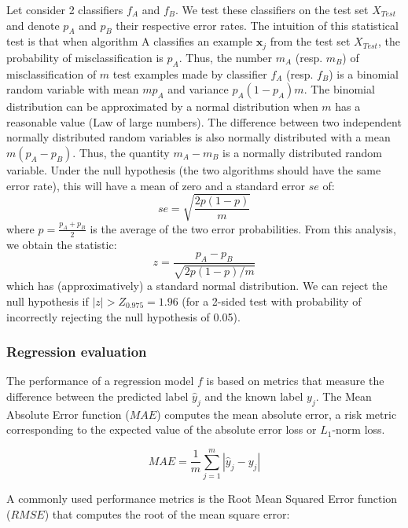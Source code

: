 Let consider 2 classifiers $f_A$ and $f_B$. We test these classifiers on the test set $X_{Test}$ and denote $p_A$ and $p_B$ their respective error rates. The intuition of this statistical test is that when algorithm A classifies an example $\textbf{x}_j$ from the test set $X_{Test}$, the probability of misclassification is $p_A$. Thus, the number $m_A$ (resp. $m_B$) of misclassification of $m$ test examples made by classifier $f_A$ (resp. $f_B$) is a binomial random variable with mean $mp_A$ and variance $p_A(1-p_A)m$. The binomial distribution can be approximated by a normal distribution when $m$ has a reasonable value (Law of large numbers). The difference between two independent normally distributed random variables is also normally distributed with a mean $m(p_A-p_B)$. Thus, the quantity $m_A-m_B$ is a normally distributed random variable. Under the null hypothesis (the two algorithms should have the same error rate), this will have a mean of zero and a standard error $se$ of:
\begin{equation}
se = \sqrt{\frac{2p(1-p)}{m}}
\end{equation}
\noindent where $p=\frac{p_A+p_B}{2}$ is the average of the two error probabilities. From this analysis, we obtain the statistic:
\begin{equation}
z=\frac{p_A-p_B}{\sqrt{2p(1-p)/m}}
\end{equation}
\noindent which has (approximatively) a standard normal distribution. We can reject the null hypothesis if $|z| > Z_{0.975} = 1.96$ (for a 2-sided test with probability of incorrectly rejecting the null hypothesis of 0.05).


\subsubsection{Regression evaluation}
The performance of a regression model $f$ is based on metrics that measure the difference between the predicted label $\hat{y}_j$ and the known label $y_j$. The Mean Absolute Error function ($MAE$) computes the mean absolute error, a risk metric corresponding to the expected value of the absolute error loss or $L_1$-norm loss.

\begin{equation}
MAE = \frac{1}{m} \sum_{j=1}^m|\hat{y}_j-y_j|
\end{equation}

A commonly used performance metrics is the Root Mean Squared Error function ($RMSE$) that computes the root of the mean square error: 

